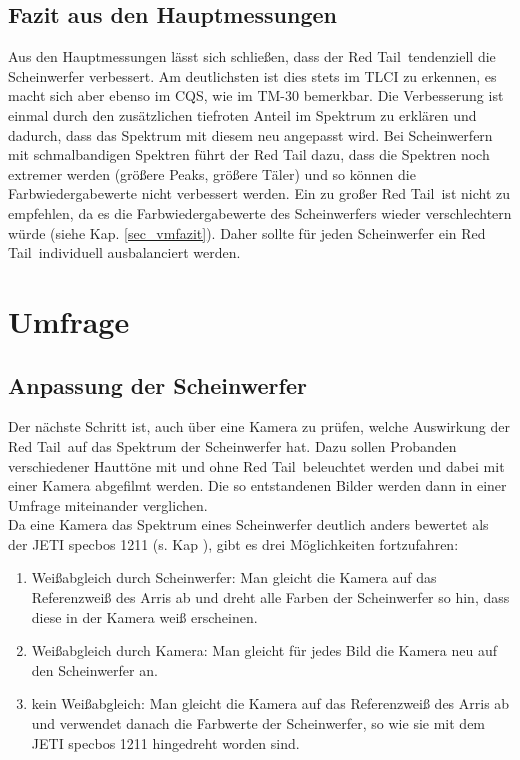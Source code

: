 \section{Fazit aus den Hauptmessungen}
\label{sec_fazithm}
Aus den Hauptmessungen lässt sich schließen, dass der \glqq Red Tail\grqq\ tendenziell die Scheinwerfer verbessert. Am deutlichsten ist dies stets im TLCI zu erkennen, es macht sich aber ebenso im CQS, wie im TM-30 bemerkbar. Die Verbesserung ist einmal durch den zusätzlichen tiefroten Anteil im Spektrum zu erklären und dadurch, dass das Spektrum mit diesem neu angepasst wird. Bei Scheinwerfern mit schmalbandigen Spektren führt der Red Tail dazu, dass die Spektren noch extremer werden (größere Peaks, größere Täler) und so können die Farbwiedergabewerte nicht verbessert werden. Ein zu großer \glqq Red Tail\grqq\ ist nicht zu empfehlen, da es die Farbwiedergabewerte des Scheinwerfers wieder verschlechtern würde (siehe Kap. \ref{sec_vmfazit}). Daher sollte für jeden Scheinwerfer ein \glqq Red Tail\grqq\ individuell ausbalanciert werden.




\chapter{Umfrage}

\section{Anpassung der Scheinwerfer}
\label{sec_anpassunglampen}
Der nächste Schritt ist, auch über eine Kamera zu prüfen, welche Auswirkung der \glqq Red Tail\grqq\ auf das Spektrum der Scheinwerfer hat. Dazu sollen Probanden verschiedener Hauttöne mit und ohne \glqq Red Tail\grqq\ beleuchtet werden und dabei mit einer Kamera abgefilmt werden. Die so entstandenen Bilder werden dann in einer Umfrage miteinander verglichen.\\
Da eine Kamera das Spektrum eines Scheinwerfer deutlich anders bewertet als der JETI specbos 1211 (s. Kap ), gibt es drei Möglichkeiten fortzufahren:

\begin{enumerate}\setlength{\itemsep}{0ex}
\item Weißabgleich durch Scheinwerfer: Man gleicht die Kamera auf das Referenzweiß des Arris ab und dreht alle Farben der Scheinwerfer so hin, dass diese in der Kamera weiß erscheinen.
\item Weißabgleich durch Kamera: Man gleicht für jedes Bild die Kamera neu auf den Scheinwerfer an.
\item kein Weißabgleich: Man gleicht die Kamera auf das Referenzweiß des Arris ab und verwendet danach die Farbwerte der Scheinwerfer, so wie sie mit dem JETI specbos 1211 hingedreht worden sind.
\end{enumerate}

